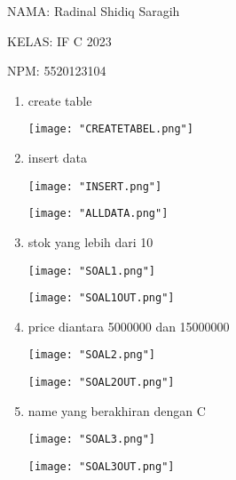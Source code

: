 \documentclass[12pt,a4paper]{article}
\date{}
\begin{document}
  NAMA: Radinal Shidiq Saragih

  KELAS: IF C 2023

  NPM: 5520123104

\begin{enumerate}

  \item create table

  \begin{center}

  \texttt{[image: "CREATETABEL.png"]}

  \end{center}

  \item insert data

  \begin{center}

  \texttt{[image: "INSERT.png"]}

  \texttt{[image: "ALLDATA.png"]}

  \end{center}

  \item stok yang lebih dari 10

  \begin{center}

  \texttt{[image: "SOAL1.png"]}

  \texttt{[image: "SOAL1OUT.png"]}

  \end{center}

  \item price diantara 5000000 dan 15000000

  \begin{center}

  \texttt{[image: "SOAL2.png"]}

  \texttt{[image: "SOAL2OUT.png"]}

  \end{center}

  \item name yang berakhiran dengan C

  \begin{center}

  \texttt{[image: "SOAL3.png"]}

  \texttt{[image: "SOAL3OUT.png"]}

  \end{center}

\end{enumerate}
\end{document}
